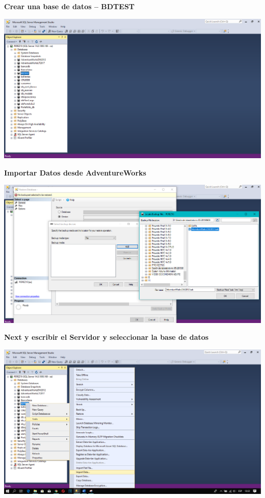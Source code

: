 \item{
\textbf{Crear una base de datos – BDTEST}
\begin{center}
\includegraphics[width=15cm]{./Imagenes/imagen1}
\end{center}
\textbf{Importar Datos desde AdventureWorks}
\begin{center}
\includegraphics[width=15cm]{./Imagenes/imagen2}
\end{center}
\textbf{Next y escribir el Servidor y seleccionar la base de datos}
\begin{center}
\includegraphics[width=15cm]{./Imagenes/imagen3}

\end{center}}
